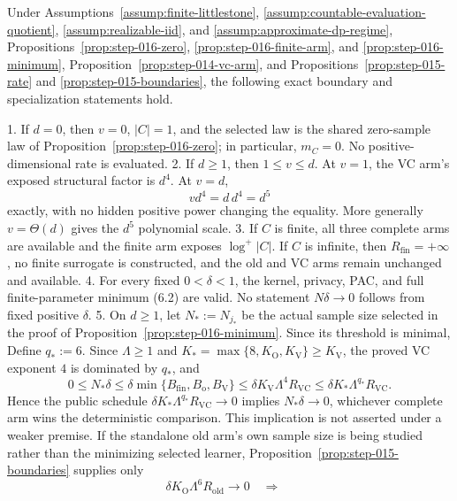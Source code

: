 \begin{proposition}\label{prop:step-016-frontier}
Under Assumptions~\ref{assump:finite-littlestone},
\ref{assump:countable-evaluation-quotient},
\ref{assump:realizable-iid}, and
\ref{assump:approximate-dp-regime},
Propositions~\ref{prop:step-016-zero},
\ref{prop:step-016-finite-arm}, and
\ref{prop:step-016-minimum}, Proposition~\ref{prop:step-014-vc-arm}, and 
Propositions~\ref{prop:step-015-rate} and
\ref{prop:step-015-boundaries}, the following exact boundary and
specialization statements hold.

1. If \(d=0\), then \(v=0\), \(|C|=1\), and the selected law is the shared
   zero-sample law of Proposition~\ref{prop:step-016-zero}; in particular,
   \(m_C=0\). No positive-dimensional rate is evaluated.
2. If \(d\ge1\), then \(1\le v\le d\). At \(v=1\), the VC arm's exposed
   structural factor is \(d^4\). At \(v=d\),
   \[
   vd^4=d\,d^4=d^5
   \tag{7.1}
   \]
   exactly, with no hidden positive power changing the equality. More
   generally \(v=\Theta(d)\) gives the \(d^5\) polynomial scale.
3. If \(C\) is finite, all three complete arms are available and the finite
   arm exposes \(\log^+|C|\). If \(C\) is infinite, then
   \(R_{\mathrm{fin}}=+\infty\), no finite surrogate is constructed, and the
   old and VC arms remain unchanged and available.
4. For every fixed \(0<\delta<1\), the kernel, privacy, PAC, and full
   finite-parameter minimum (6.2) are valid. No statement
   \(N\delta\to0\) follows from fixed positive \(\delta\).
5. On \(d\ge1\), let \(N_*:=N_{j_*}\) be the actual sample size selected in
   the proof of Proposition~\ref{prop:step-016-minimum}. Since its threshold
   is minimal,
   Define \(q_*:=6\). Since \(\Lambda\ge1\) and
   \(K_*=\max\{8,K_{\mathrm O},K_{\mathrm V}\}\ge K_{\mathrm V}\),
   the proved VC exponent \(4\) is dominated by \(q_*\), and
   \[
   0\le N_*\delta
   \le\delta\min\{B_{\mathrm{fin}},B_{\mathrm o},B_{\mathrm V}\}
   \le\delta K_{\mathrm V}\Lambda^4R_{\mathrm{VC}}
   \le\delta K_*\Lambda^{q_*}R_{\mathrm{VC}}.
   \tag{7.2}
   \]
   Hence the public schedule
   \(\delta K_*\Lambda^{q_*}R_{\mathrm{VC}}\to0\) implies
   \(N_*\delta\to0\), whichever complete arm wins the deterministic
   comparison. This implication is not asserted under a weaker premise.
   If the standalone old arm's own sample size is being studied rather than
   the minimizing selected learner, Proposition~\ref{prop:step-015-boundaries} supplies only
   \[
   \delta K_{\mathrm O}\Lambda^6R_{\mathrm{old}}\to0
   \quad\Longrightarrow\quad
\]
\end{proposition}
